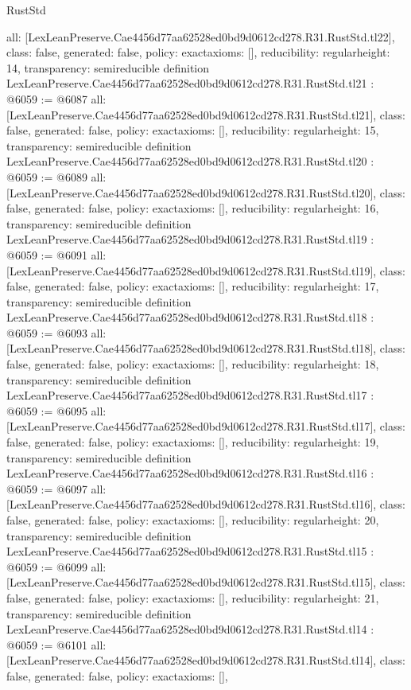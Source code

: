 \begin{lexlean}{RustStd}
\begin{coremodule}
{  all: [LexLeanPreserve.Cae4456d77aa62528ed0bd9d0612cd278.R31.RustStd.tl22],
  class: false,
  generated: false,
  policy: exact{axioms: []},
  reducibility: regular{height: 14},
  transparency: semireducible
}
definition LexLeanPreserve.Cae4456d77aa62528ed0bd9d0612cd278.R31.RustStd.tl21 : @6059 := @6087 {
  all: [LexLeanPreserve.Cae4456d77aa62528ed0bd9d0612cd278.R31.RustStd.tl21],
  class: false,
  generated: false,
  policy: exact{axioms: []},
  reducibility: regular{height: 15},
  transparency: semireducible
}
definition LexLeanPreserve.Cae4456d77aa62528ed0bd9d0612cd278.R31.RustStd.tl20 : @6059 := @6089 {
  all: [LexLeanPreserve.Cae4456d77aa62528ed0bd9d0612cd278.R31.RustStd.tl20],
  class: false,
  generated: false,
  policy: exact{axioms: []},
  reducibility: regular{height: 16},
  transparency: semireducible
}
definition LexLeanPreserve.Cae4456d77aa62528ed0bd9d0612cd278.R31.RustStd.tl19 : @6059 := @6091 {
  all: [LexLeanPreserve.Cae4456d77aa62528ed0bd9d0612cd278.R31.RustStd.tl19],
  class: false,
  generated: false,
  policy: exact{axioms: []},
  reducibility: regular{height: 17},
  transparency: semireducible
}
definition LexLeanPreserve.Cae4456d77aa62528ed0bd9d0612cd278.R31.RustStd.tl18 : @6059 := @6093 {
  all: [LexLeanPreserve.Cae4456d77aa62528ed0bd9d0612cd278.R31.RustStd.tl18],
  class: false,
  generated: false,
  policy: exact{axioms: []},
  reducibility: regular{height: 18},
  transparency: semireducible
}
definition LexLeanPreserve.Cae4456d77aa62528ed0bd9d0612cd278.R31.RustStd.tl17 : @6059 := @6095 {
  all: [LexLeanPreserve.Cae4456d77aa62528ed0bd9d0612cd278.R31.RustStd.tl17],
  class: false,
  generated: false,
  policy: exact{axioms: []},
  reducibility: regular{height: 19},
  transparency: semireducible
}
definition LexLeanPreserve.Cae4456d77aa62528ed0bd9d0612cd278.R31.RustStd.tl16 : @6059 := @6097 {
  all: [LexLeanPreserve.Cae4456d77aa62528ed0bd9d0612cd278.R31.RustStd.tl16],
  class: false,
  generated: false,
  policy: exact{axioms: []},
  reducibility: regular{height: 20},
  transparency: semireducible
}
definition LexLeanPreserve.Cae4456d77aa62528ed0bd9d0612cd278.R31.RustStd.tl15 : @6059 := @6099 {
  all: [LexLeanPreserve.Cae4456d77aa62528ed0bd9d0612cd278.R31.RustStd.tl15],
  class: false,
  generated: false,
  policy: exact{axioms: []},
  reducibility: regular{height: 21},
  transparency: semireducible
}
definition LexLeanPreserve.Cae4456d77aa62528ed0bd9d0612cd278.R31.RustStd.tl14 : @6059 := @6101 {
  all: [LexLeanPreserve.Cae4456d77aa62528ed0bd9d0612cd278.R31.RustStd.tl14],
  class: false,
  generated: false,
  policy: exact{axioms: []},
}
\end{coremodule}
\end{lexlean}
